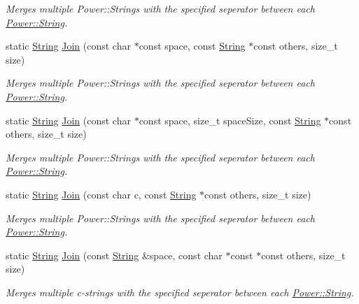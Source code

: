 \begin{DoxyCompactItemize}
\begin{DoxyCompactList}\small\item\em Merges multiple Power\+::\+Strings with the specified seperator between each \hyperlink{class_power_1_1_string}{Power\+::\+String}. \end{DoxyCompactList}\item 
static \hyperlink{class_power_1_1_string}{String} \hyperlink{class_power_1_1_string_a76705ac5e044bef73714c8e04fabc8cc}{Join} (const char $\ast$const space, const \hyperlink{class_power_1_1_string}{String} $\ast$const others, size\+\_\+t size)
\begin{DoxyCompactList}\small\item\em Merges multiple Power\+::\+Strings with the specified seperator between each \hyperlink{class_power_1_1_string}{Power\+::\+String}. \end{DoxyCompactList}\item 
static \hyperlink{class_power_1_1_string}{String} \hyperlink{class_power_1_1_string_a5ee260a9a58525aa6cd97e8de8f079eb}{Join} (const char $\ast$const space, size\+\_\+t space\+Size, const \hyperlink{class_power_1_1_string}{String} $\ast$const others, size\+\_\+t size)
\begin{DoxyCompactList}\small\item\em Merges multiple Power\+::\+Strings with the specified seperator between each \hyperlink{class_power_1_1_string}{Power\+::\+String}. \end{DoxyCompactList}\item 
static \hyperlink{class_power_1_1_string}{String} \hyperlink{class_power_1_1_string_a509a15ecf870d362b2b7c7fb775c785b}{Join} (const char c, const \hyperlink{class_power_1_1_string}{String} $\ast$const others, size\+\_\+t size)
\begin{DoxyCompactList}\small\item\em Merges multiple Power\+::\+Strings with the specified seperator between each \hyperlink{class_power_1_1_string}{Power\+::\+String}. \end{DoxyCompactList}\item 
static \hyperlink{class_power_1_1_string}{String} \hyperlink{class_power_1_1_string_a582be11833bb084d9dbf456b792e1eee}{Join} (const \hyperlink{class_power_1_1_string}{String} \&space, const char $\ast$const $\ast$const others, size\+\_\+t size)
\begin{DoxyCompactList}\small\item\em Merges multiple c-\/strings with the specified seperator between each \hyperlink{class_power_1_1_string}{Power\+::\+String}. \end{DoxyCompactList}\item 

\end{DoxyCompactItemize}
